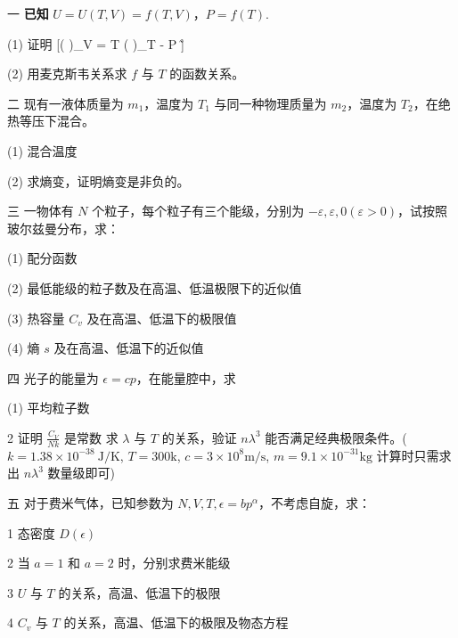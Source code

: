 一 \textbf{已知} $U = U(T, V) = f(T, V)$，$P = f(T)$.

(1) 证明
[\left(  \right)_V = T \left(  \right)_T - P \~]

(2) 用麦克斯韦关系求 $f$ 与 $T$ 的函数关系。

二 现有一液体质量为 $m_1$，温度为 $T_1$ 与同一种物理质量为 $m_2$，温度为 $T_2$，在绝热等压下混合。

(1) 混合温度

(2) 求熵变，证明熵变是非负的。

三 一物体有 $N$ 个粒子，每个粒子有三个能级，分别为 $-\varepsilon, \varepsilon, 0 (\varepsilon > 0)$，试按照玻尔兹曼分布，求：

(1) 配分函数

(2) 最低能级的粒子数及在高温、低温极限下的近似值

(3) 热容量 $C_v$ 及在高温、低温下的极限值

(4) 熵 $s$ 及在高温、低温下的近似值

四 光子的能量为 $\epsilon = cp$，在能量腔中，求

(1) 平均粒子数

{2} 证明 $\frac{C_V}{Nk}$ 是常数
求 $\lambda$ 与 $T$ 的关系，验证 $n \lambda^3$ 能否满足经典极限条件。($k=1.38 \times 10^{-38} \ \text{J/K}$, $T=300 \text{k}$, $c=3 \times 10^8 \text{m/s}$, $m=9.1 \times 10^{-31} \text{kg}$ 计算时只需求出 $n \lambda^3$ 数量级即可)



五 对于费米气体，已知参数为 $N, V, T, \epsilon = b p^\alpha$，不考虑自旋，求：


{1} 态密度 $D(\epsilon)$

{2} 当 $a=1$ 和 $a=2$ 时，分别求费米能级

{3} $U$ 与 $T$ 的关系，高温、低温下的极限

{4} $C_v$ 与 $T$ 的关系，高温、低温下的极限及物态方程